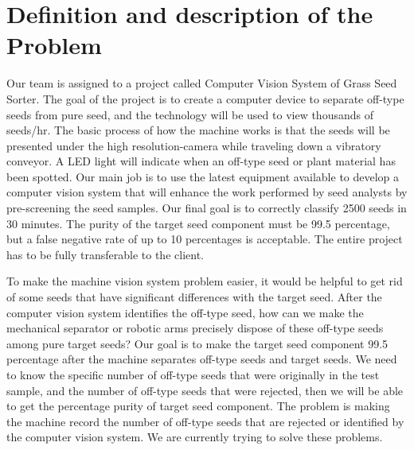 \documentclass[letter,draftclsnoffot, onecolumn]{IEEEtran}
\begin{document}
\section{Definition and description of the Problem}
Our team is assigned to a project called Computer Vision System of Grass Seed Sorter. The goal of the project is to create a computer device to separate off-type seeds from pure seed, and the technology will be used to view thousands of seeds/hr.  The basic process of how the machine works is that the seeds will be presented under the high resolution-camera while traveling down a vibratory conveyor. A LED light will indicate when an off-type seed or plant material has been spotted. Our main job is to use the latest equipment available to develop a computer vision system that will enhance the work performed by seed analysts by pre-screening the seed samples. Our final goal is to correctly classify 2500 seeds in 30 minutes. The purity of the target seed component must be 99.5 percentage, but a false negative rate of up to 10 percentages is acceptable. The entire project has to be fully transferable to the client.
\par
To make the machine vision system problem easier, it would be helpful to get rid of some seeds that have significant differences with the target seed. After the computer vision system identifies the off-type seed, how can we make the mechanical separator or robotic arms precisely dispose of these off-type seeds among pure target seeds? Our goal is to make the target seed component 99.5 percentage after the machine separates off-type seeds and target seeds. We need to know the specific number of off-type seeds that were originally in the test sample, and the number of off-type seeds that were rejected, then we will be able to get the percentage purity of target seed component. The problem is making the machine record the number of off-type seeds that are rejected or identified by the computer vision system. We are currently trying to solve these problems.
\pagebreak
\end{document}
